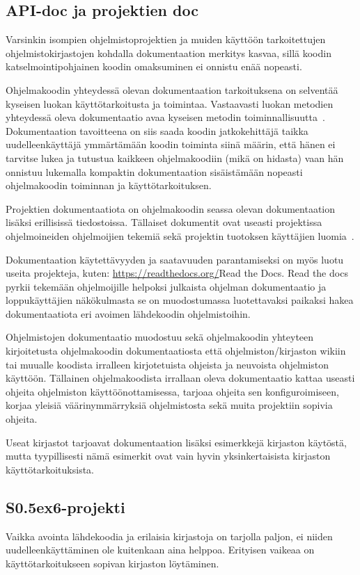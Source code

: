 \documentclass[finnish]{tktltiki2}
\theoremstyle{definition}
\theoremstyle{remark}
\begin{document}
\subsection{API-doc ja projektien doc}
Varsinkin isompien ohjelmistoprojektien ja muiden käyttöön tarkoitettujen ohjelmistokirjastojen kohdalla dokumentaation merkitys kasvaa, sillä koodin katselmointipohjainen koodin omaksuminen ei onnistu enää nopeasti.

Ohjelmakoodin yhteydessä olevan dokumentaation tarkoituksena on selventää kyseisen luokan käyttötarkoitusta ja toimintaa. Vastaavasti luokan metodien yhteydessä oleva dokumentaatio avaa kyseisen metodin toiminnallisuutta~\cite{javadoc}.
Dokumentaation tavoitteena on siis saada koodin jatkokehittäjä taikka uudelleenkäyttäjä ymmärtämään koodin toiminta siinä määrin, että hänen ei tarvitse lukea ja tutustua kaikkeen ohjelmakoodiin (mikä on hidasta) vaan hän onnistuu lukemalla kompaktin dokumentaation sisäistämään nopeasti ohjelmakoodin toiminnan ja käyttötarkoituksen.

Projektien dokumentaatiota on ohjelmakoodin seassa olevan dokumentaation lisäksi erillisissä tiedostoissa. Tällaiset dokumentit ovat useasti  projektissa ohjelmoineiden ohjelmoijien tekemiä sekä projektin tuotoksen käyttäjien luomia~\cite{using-wikis-in-sw}.

Dokumentaation käytettävyyden ja saatavuuden parantamiseksi on myös luotu useita projekteja, kuten: \url{https://readthedocs.org/}{Read the Docs}. Read the docs pyrkii tekemään ohjelmoijille helpoksi julkaista ohjelman dokumentaatio ja loppukäyttäjien näkökulmasta se on muodostumassa luotettavaksi paikaksi hakea dokumentaatiota eri avoimen lähdekoodin ohjelmistoihin.

Ohjelmistojen dokumentaatio muodostuu sekä ohjelmakoodin yhteyteen kirjoitetusta ohjelmakoodin dokumentaatiosta että ohjelmiston/kirjaston wikiin~\cite{using-wikis-in-sw} tai muualle koodista irralleen kirjotetuista ohjeista ja neuvoista ohjelmiston käyttöön.
Tällainen ohjelmakoodista irrallaan oleva dokumentaatio kattaa useasti ohjeita ohjelmiston käyttöönottamisessa, tarjoaa ohjeita sen konfiguroimiseen, korjaa yleisiä väärinymmärryksiä ohjelmistosta sekä muita projektiin sopivia ohjeita.

Useat kirjastot tarjoavat dokumentaation lisäksi esimerkkejä kirjaston käytöstä, mutta tyypillisesti nämä esimerkit ovat vain hyvin yksinkertaisista kirjaston käyttötarkoituksista.

\subsection{S\raise0.5ex\hbox{6}-projekti}
Vaikka avointa lähdekoodia ja erilaisia kirjastoja on tarjolla paljon, ei niiden uudelleenkäyttäminen ole kuitenkaan aina helppoa. Erityisen vaikeaa on käyttötarkoitukseen sopivan kirjaston löytäminen.
\end{document}
